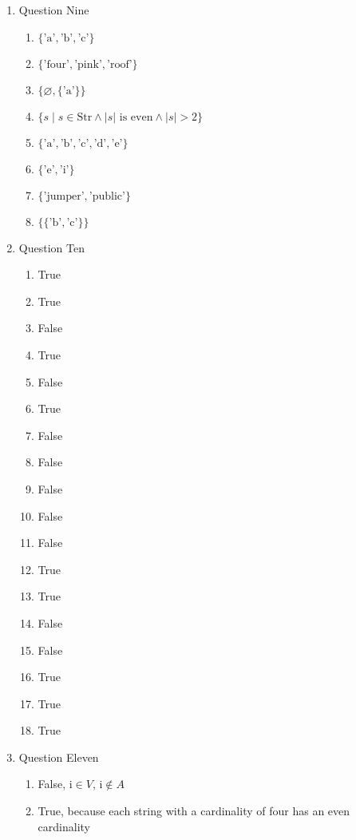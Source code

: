 \documentclass{article}
\begin{document}
\begin{enumerate}
\begin{enumerate}
    \end{enumerate}
    \item Question Nine
    \begin{enumerate}
        \item $\{\text{'a'}, \text{'b'}, \text{'c'}\}$
        \item $\{\text{'four'}, \text{'pink'}, \text{'roof'}\}$
        \item $\{\varnothing, \{\text{'a'}\}\}$
        \item $\{s \mid s \in \text{Str} \land | s | \text{ is even} \land | s | > 2\}$
        \item $\{\text{'a'}, \text{'b'}, \text{'c'}, \text{'d'}, \text{'e'}\}$
        \item $\{\text{'e'}, \text{'i'}\}$
        \item $\{\text{'jumper'}, \text{'public'}\}$
        \item $\{\{\text{'b'}, \text{'c'}\}\}$
    \end{enumerate}
    \item Question Ten
    \begin{enumerate}
        \item True
        \item True
        \item False
        \item True
        \item False
        \item True
        \item False
        \item False
        \item False
        \item False
        \item False
        \item True
        \item True
        \item False
        \item False
        \item True
        \item True
        \item True
    \end{enumerate}
    \item Question Eleven
    \begin{enumerate}
        \item False, $\text{i} \in V$, $\text{i} \notin A$
        \item True, because each string with a cardinality of four has an even cardinality

\end{enumerate}
\end{enumerate}
\end{document}
